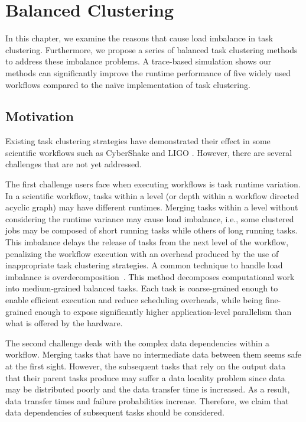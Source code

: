\chapter{Balanced Clustering} 
\label{chap:balance}

In this chapter, we examine the reasons that cause load imbalance in task clustering. Furthermore, we propose a series of balanced task clustering methods to address these imbalance problems. A trace-based simulation shows our methods can significantly improve the runtime performance of five widely used workflows compared to the na\"{i}ve implementation of task clustering.

\section{Motivation}


Existing task clustering strategies have demonstrated their effect in some scientific workflows such as CyberShake \cite{Rynge2012} and LIGO \cite{Deelman2002}. However, there are several challenges that are not yet addressed. 

The first challenge users face when executing workflows is task runtime variation. 
In a scientific workflow, tasks within a level (or depth within a workflow directed acyclic graph) may have different runtimes. Merging tasks within a level without considering the runtime variance may cause load imbalance, i.e., some clustered jobs may be composed of short running tasks while others of long running tasks. This imbalance delays the release of tasks from the next level of the workflow, penalizing the workflow execution with an overhead produced by the use of inappropriate task clustering strategies.
A common technique to handle load imbalance is overdecomposition~\cite{Lifflander2012}.
This method decomposes computational work into medium-grained balanced tasks. Each task is coarse-grained enough to enable efficient execution and reduce scheduling overheads, while being fine-grained enough to expose significantly higher application-level parallelism than what is offered by the hardware. 

The second challenge deals with the complex data dependencies within a workflow. 
Merging tasks that have no intermediate data between them seems safe at the first sight. However, the subsequent tasks that rely on the output data that their parent tasks produce may suffer a data locality problem since data may be distributed poorly and the data transfer time is increased.  As a result, data transfer times and failure probabilities increase. Therefore, we claim that data dependencies of subsequent tasks should be considered.


